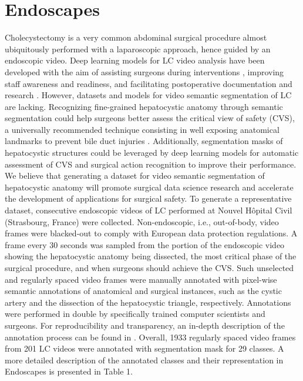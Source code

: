 \documentclass[twoside, print]{ieeecolor_arxiv}
\begin{document}
\section{Endoscapes}
Cholecystectomy is a very common abdominal surgical procedure almost ubiquitously performed with a laparoscopic approach, hence guided by an endoscopic video. Deep learning models for LC video analysis have been developed with the aim of assisting surgeons during interventions \cite{mascagni2021artificial}\cite{ madani2021artificial}, improving staff awareness and readiness, and facilitating postoperative documentation and research \cite{mascagni2021computer}. However, datasets and models for video semantic segmentation of LC are lacking. Recognizing fine-grained hepatocystic anatomy through semantic segmentation could help surgeons better assess the critical view of safety (CVS), a universally recommended technique consisting in well exposing anatomical landmarks to prevent bile duct injuries \cite{brunt2020safe}. Additionally, segmentation masks of hepatocystic structures could be leveraged by deep learning models for automatic assessment of CVS \cite{mascagni2021artificial} and surgical action recognition \cite{nwoye2020recognition} to improve their performance. We believe that generating a dataset for video semantic segmentation of hepatocystic anatomy will promote surgical data science research and accelerate the development of applications for surgical safety.
To generate a representative dataset, consecutive endoscopic videos of  LC performed at Nouvel Hôpital Civil (Strasbourg, France) were collected. Non-endoscopic, i.e., out-of-body, video frames were blacked-out to comply with European data protection regulations. A frame every 30 seconds was sampled from the portion of the endoscopic video showing the hepatocystic anatomy being dissected, the most critical phase of the surgical procedure, and when surgeons should achieve the CVS. Such unselected and regularly spaced video frames were manually annotated with pixel-wise semantic annotations of anatomical and surgical instances, such as the cystic artery and the dissection of the hepatocystic triangle, respectively. Annotations were performed in double by specifically trained computer scientists and surgeons. For reproducibility and transparency, an in-depth description of the annotation process can be found in \cite{annotationprotocol}. 
Overall, 1933 regularly spaced video frames from 201 LC videos were annotated with segmentation mask for 29 classes. A more detailed description of the annotated classes and their representation in Endoscapes is presented in Table 1.
\end{document}
